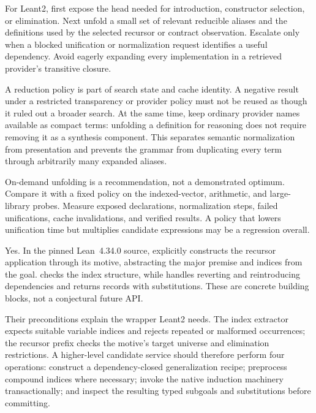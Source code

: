 For Leant2, first expose the head needed for introduction, constructor selection, or elimination. Next unfold a small set of relevant reducible aliases and the definitions used by the selected recursor or contract observation. Escalate only when a blocked unification or normalization request identifies a useful dependency. Avoid eagerly expanding every implementation in a retrieved provider's transitive closure.

A reduction policy is part of search state and cache identity. A negative result under a restricted transparency or provider policy must not be reused as though it ruled out a broader search. At the same time, keep ordinary provider names available as compact terms: unfolding a definition for reasoning does not require removing it as a synthesis component. This separates semantic normalization from presentation and prevents the grammar from duplicating every term through arbitrarily many expanded aliases.

On-demand unfolding is a recommendation, not a demonstrated optimum. Compare it with a fixed policy on the indexed-vector, arithmetic, and large-library probes. Measure exposed declarations, normalization steps, failed unifications, cache invalidations, and verified results. A policy that lowers unification time but multiplies candidate expressions may be a regression overall.


\answer Yes. In the pinned Lean~4.34.0 source,  explicitly constructs the recursor application through its motive, abstracting the major premise and indices from the goal.  checks the index structure, while  handles reverting and reintroducing dependencies and returns  records with substitutions. These are concrete building blocks, not a conjectural future API.\cite{leaninduction}

Their preconditions explain the wrapper Leant2 needs. The index extractor expects suitable variable indices and rejects repeated or malformed occurrences; the recursor prefix checks the motive's target universe and elimination restrictions. A higher-level candidate service should therefore perform four operations: construct a dependency-closed generalization recipe; preprocess compound indices where necessary; invoke the native induction machinery transactionally; and inspect the resulting typed subgoals and substitutions before committing.


